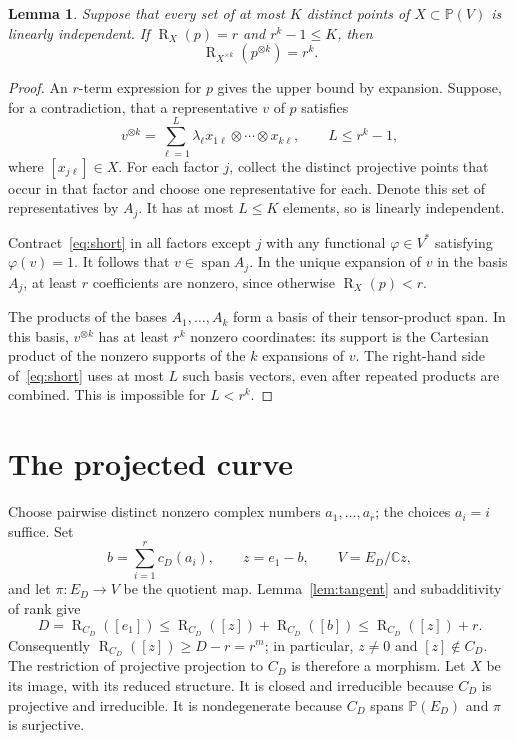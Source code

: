 \documentclass[11pt]{article}
\newtheorem{lemma}[theorem]{Lemma}
\theoremstyle{remark}\newtheorem{remark}[theorem]{Remark}
\newcommand{\C}{\mathbb C}
\newcommand{\PP}{\mathbb P}
\newcommand{\rk}{\operatorname{R}}
\newcommand{\Span}{\operatorname{span}}
\begin{document}
\begin{lemma}\label{lem:product}
Suppose that every set of at most $K$ distinct points of $X\subset\PP(V)$ is linearly independent. If $\rk_X(p)=r$ and $r^k-1\leq K$, then
\[
 \rk_{X^{\times k}}(p^{\otimes k})=r^k.
\]
\end{lemma}
\begin{proof}
An $r$-term expression for $p$ gives the upper bound by expansion. Suppose, for a contradiction, that a representative $v$ of $p$ satisfies
\begin{equation}\label{eq:short}
 v^{\otimes k}=\sum_{\ell=1}^{L}\lambda_\ell
 x_{1\ell}\otimes\cdots\otimes x_{k\ell},\qquad L\leq r^k-1,
\end{equation}
where $[x_{j\ell}]\in X$. For each factor $j$, collect the distinct projective points that occur in that factor and choose one representative for each. Denote this set of representatives by $A_j$. It has at most $L\leq K$ elements, so is linearly independent.

Contract~\eqref{eq:short} in all factors except $j$ with any functional $\varphi\in V^*$ satisfying $\varphi(v)=1$. It follows that $v\in\Span A_j$. In the unique expansion of $v$ in the basis $A_j$, at least $r$ coefficients are nonzero, since otherwise $\rk_X(p)<r$.

The products of the bases $A_1,\ldots,A_k$ form a basis of their tensor-product span. In this basis, $v^{\otimes k}$ has at least $r^k$ nonzero coordinates: its support is the Cartesian product of the nonzero supports of the $k$ expansions of $v$. The right-hand side of~\eqref{eq:short} uses at most $L$ such basis vectors, even after repeated products are combined. This is impossible for $L<r^k$.
\end{proof}

\section{The projected curve}
Choose pairwise distinct nonzero complex numbers $a_1,\ldots,a_r$; the choices $a_i=i$ suffice. Set
\[
 b=\sum_{i=1}^r c_D(a_i),\qquad z=e_1-b,
 \qquad V=E_D/\C z,
\]
and let $\pi:E_D\to V$ be the quotient map. Lemma~\ref{lem:tangent} and subadditivity of rank give
\begin{equation}\label{eq:center-rank}
 D=\rk_{C_D}([e_1])\leq\rk_{C_D}([z])+\rk_{C_D}([b])
 \leq\rk_{C_D}([z])+r.
\end{equation}
Consequently $\rk_{C_D}([z])\geq D-r=r^m$; in particular, $z\neq0$ and $[z]\notin C_D$. The restriction of projective projection to $C_D$ is therefore a morphism. Let $X$ be its image, with its reduced structure. It is closed and irreducible because $C_D$ is projective and irreducible. It is nondegenerate because $C_D$ spans $\PP(E_D)$ and $\pi$ is surjective.
\end{document}
